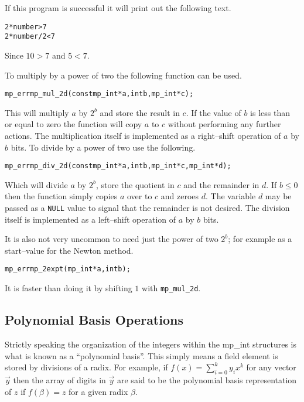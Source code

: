 \documentclass[synpaper]{book}
\begin{document}
If this program is successful it will print out the following text.

\begin{alltt}
2*number > 7
2*number/2 < 7
\end{alltt}

Since $10 > 7$ and $5 < 7$.

To multiply by a power of two the following function can be used.

\begin{alltt}
mp_err mp_mul_2d(const mp_int *a, int b, mp_int *c);
\end{alltt}

This will multiply $a$ by $2^b$ and store the result in $c$.  If the value of $b$ is less than or
equal to zero the function will copy $a$ to $c$ without performing any further actions.       The
multiplication itself is implemented as a right--shift operation of $a$ by $b$ bits. To divide by a
power of two use the following.

\begin{alltt}
mp_err mp_div_2d (const mp_int *a, int b, mp_int *c, mp_int *d);
\end{alltt}
Which will divide $a$ by $2^b$, store the quotient in $c$ and the remainder in $d$.  If $b \le 0$
then the function simply copies $a$ over to $c$ and zeroes $d$. The variable $d$ may be
passed as a \texttt{NULL} value to signal that the remainder is not desired.  The division itself
is implemented as a left--shift operation of $a$ by $b$ bits.

It is also not very uncommon to need just the power of two $2^b$;  for example as a start--value
for
the Newton method.

\begin{alltt}
mp_err mp_2expt(mp_int *a, int b);
\end{alltt}
It is faster than doing it by shifting $1$ with \texttt{mp\_mul\_2d}.

\subsection{Polynomial Basis Operations}

Strictly speaking the organization of the integers within the mp\_int structures is what is known
as a ``polynomial basis''.  This simply  means a field element is stored by divisions of a radix.
For example, if $f(x) = \sum_{i=0}^{k} y_ix^k$ for any vector $\vec y$ then the array of digits in
$\vec y$ are said to be the polynomial basis representation of $z$ if $f(\beta) = z$ for a given
radix $\beta$.
\end{document}

